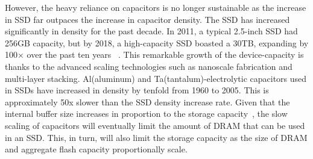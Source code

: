 
However, the heavy reliance on capacitors is no longer sustainable as the increase in SSD far outpaces 
the increase in capacitor density.
The SSD has increased significantly in density for the past decade. 
In 2011, a typical 2.5-inch SSD had 256GB capacity, but
by 2018, a high-capacity SSD boasted a 30TB, expanding by 100× over the past ten years
~\cite{samsung2011, anandtech18samsung}. 
This remarkable growth of the device-capacity is thanks to the advanced scaling technologies 
such as nanoscale fabrication%
and multi-layer stacking. %
Al(aluminum) and Ta(tantalum)-electrolytic capacitors used in SSDs 
have increased in density by tenfold from 1960 to 2005. 
This is approximately 50x slower than the SSD density increase rate.
Given that the internal buffer size increases in proportion to the storage capacity~\cite{ni2017hash},
the slow scaling of capacitors will eventually limit the amount of DRAM that can be used in an SSD. 
This, in turn, will also limit the storage capacity as the size of DRAM and aggregate flash capacity proportionally scale. 

\iffalse
the density gap between capacitance and memory technologies 
imposes an intrinsic limitation on the current architecture wherein 
the entire buffer is fully protected by capacitors. 
\fi


